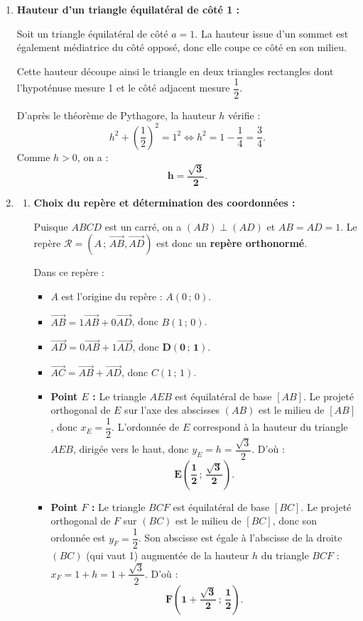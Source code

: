 \documentclass[11pt,a4paper]{article}
\newcommand{\vect}[1]{\overrightarrow{#1}}
\begin{document}
\begin{correctionbox}
\begin{enumerate}
    \item \textbf{Hauteur d'un triangle équilatéral de côté 1 :}
    
    Soit un triangle équilatéral de côté $a = 1$. La hauteur issue d'un sommet est également médiatrice du côté opposé, donc elle coupe ce côté en son milieu.
    
    Cette hauteur découpe ainsi le triangle en deux triangles rectangles dont l'hypoténuse mesure 1 et le côté adjacent mesure $\dfrac{1}{2}$.
    
    D'après le théorème de Pythagore, la hauteur $h$ vérifie :
    \[
    h^2 + \left(\frac{1}{2}\right)^2 = 1^2 \iff h^2 = 1 - \frac{1}{4} = \frac{3}{4}.
    \]
    Comme $h > 0$, on a :
    \[
    \mathbf{h = \frac{\sqrt{3}}{2}}.
    \]

    \item 
    \begin{enumerate}
        \item \textbf{Choix du repère et détermination des coordonnées :}
        
        Puisque $ABCD$ est un carré, on a $(AB) \perp (AD)$ et $AB = AD = 1$. Le repère $\mathcal{R} = (A\,;\, \vect{AB}, \vect{AD})$ est donc un \textbf{repère orthonormé}.
        
        Dans ce repère :
        \begin{itemize}[leftmargin=*,itemsep=2pt]
            \item $A$ est l'origine du repère : $A(0\,;\,0)$.
            \item $\vect{AB} = 1\vect{AB} + 0\vect{AD}$, donc $B(1\,;\,0)$.
            \item $\vect{AD} = 0\vect{AB} + 1\vect{AD}$, donc $\mathbf{D(0\,;\,1)}$.
            \item $\vect{AC} = \vect{AB} + \vect{AD}$, donc $C(1\,;\,1)$.
            \item \textbf{Point $E$ :} Le triangle $AEB$ est équilatéral de base $[AB]$.
            Le projeté orthogonal de $E$ sur l'axe des abscisses $(AB)$ est le milieu de $[AB]$, donc $x_E = \dfrac{1}{2}$.
            L'ordonnée de $E$ correspond à la hauteur du triangle $AEB$, dirigée vers le haut, donc $y_E = h = \dfrac{\sqrt{3}}{2}$.
            D'où :
            \[
            \mathbf{E\left(\frac{1}{2}\,;\, \frac{\sqrt{3}}{2}\right)}.
            \]
            \item \textbf{Point $F$ :} Le triangle $BCF$ est équilatéral de base $[BC]$.
            Le projeté orthogonal de $F$ sur $(BC)$ est le milieu de $[BC]$, donc son ordonnée est $y_F = \dfrac{1}{2}$.
            Son abscisse est égale à l'abscisse de la droite $(BC)$ (qui vaut 1) augmentée de la hauteur $h$ du triangle $BCF$ :
            $x_F = 1 + h = 1 + \dfrac{\sqrt{3}}{2}$.
            D'où :
            \[
            \mathbf{F\left(1 + \frac{\sqrt{3}}{2}\,;\, \frac{1}{2}\right)}.
            \]
        \end{itemize}


\end{enumerate}
\end{enumerate}
\end{correctionbox}
\end{document}
